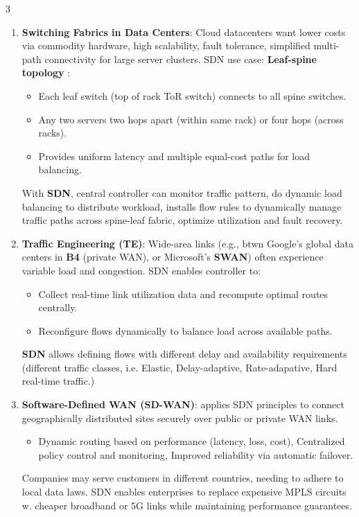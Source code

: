 \documentclass[a4paper, 9pt, landscape]{article}
\begin{document}
\begin{multicols*}{3}
\begin{enumerate}
\item \textbf{Switching Fabrics in Data Centers}: Cloud datacenters want lower costs via commodity hardware, high scalability, fault tolerance, simplified multi-path connectivity for large server clusters. SDN use case: \textbf{Leaf-spine topology} :
\begin{itemize}
  \item Each leaf switch (top of rack ToR switch) connects to all spine switches.
  \item Any two servers two hops apart (within same rack) or four hops (across racks).
  \item Provides uniform latency and multiple equal-cost paths for load balancing.
\end{itemize}
With \textbf{SDN}, central controller can monitor traffic pattern, do dynamic load balancing to distribute workload, installs flow rules to dynamically manage traffic paths across spine-leaf fabric, optimize utilization and fault recovery.

\item \textbf{Traffic Engineering (TE)}: Wide-area links (e.g., btwn Google’s global data centers in \textbf{B4} (private WAN), or Microsoft’s \textbf{SWAN}) often experience variable load and congestion. SDN enables controller to:
\begin{itemize}
  \item Collect real-time link utilization data and recompute optimal routes centrally.
  \item Reconfigure flows dynamically to balance load across available paths.
\end{itemize}
\textbf{SDN} allows defining flows with different delay and availability requirements (different traffic classes, i.e. Elastic, Delay-adaptive, Rate-adapative, Hard real-time traffic.)


\item \textbf{Software-Defined WAN (SD-WAN)}: applies SDN principles to connect geographically distributed sites securely over public or private WAN links.
\begin{itemize}
  \item Dynamic routing based on performance (latency, loss, cost), Centralized policy control and monitoring, Improved reliability via automatic failover.
\end{itemize}
Companies may serve customers in different countries, needing to adhere to local data laws. SDN enables enterprises to replace expensive MPLS circuits w. cheaper broadband or 5G links while maintaining performance guarantees.
\end{enumerate}



\end{multicols*}
\end{document}
